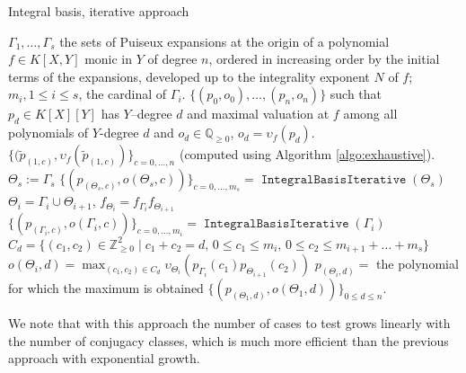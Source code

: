 \documentclass[a4paper,11pt]{amsart}%
\theoremstyle{definition}
\theoremstyle{plain}
\theoremstyle{remark}
\DeclareMathOperator{\IntegralBasisIterative}{\mathtt{IntegralBasisIterative}}
\newcommand{\Q}{{\mathbb Q}}
\newcommand{\Z}{{\mathbb Z}}
\newcommand{\vardbtilde}[1]{\tilde{\raisebox{0pt}[0.85\height]{$\tilde{#1}$}}}
\begin{document}


\begin{algorithm}[h]                      %
\caption{Integral basis, iterative approach}          %
\label{algo:iterative}
\begin{algorithmic}[1]
\REQUIRE $\Gamma_1, \dots, \Gamma_s$ the sets of Puiseux expansions at the origin of a polynomial $f \in K[X,Y]$ monic in $Y$ of degree $n$, ordered in increasing order by the initial terms of the expansions, developed up to the integrality exponent $N$ of $f$; $m_i, 1 \le i \le s$, the cardinal of $\Gamma_i$.
\ENSURE $\{(p_0, o_0), \dots, (p_{n}, o_{n})\}$ such that $p_d \in K[X][Y]$ has $Y$--degree $d$ and
maximal valuation at $f$ among all polynomials of $Y$-degree $d$ and $o_d \in \Q_{\geq 0}$, $o_d = \upsilon_f(p_d)$.
\RETURN $\{(\tilde p_{(1, c)}, \upsilon_{f}(\tilde p_{(1, c)})\}_{c= 0, \dots, n}$ (computed using Algorithm \ref{algo:exhaustive}).
\ELSE
\STATE $\Theta_s := \Gamma_s$
\STATE $\{(p_{(\Theta_s,c)}, o(\Theta_s, c))\}_{c = 0, \dots, m_s} = \IntegralBasisIterative(\Theta_s)$
\STATE $\Theta_i = \Gamma_i \cup \Theta_{i+1}$, $f_{\Theta_i} = f_{\Gamma_i} f_{\Theta_{i+1}}$
\STATE $\{(p_{(\Gamma_i,c)}, o(\Gamma_i, c))\}_{c = 0, \dots, m_i} = \IntegralBasisIterative(\Gamma_i)$
\STATE $C_d = \{(c_1, c_2) \in \Z_{\ge 0}^2 \mid c_1 + c_2 = d\mbox{, }0 \leq c_1 \leq m_i\mbox{, }0 \leq c_2 \leq m_{i+1} + \dots + m_s\}$
\STATE $o(\Theta_{i}, d) = \max_{(c_1, c_2) \in C_d} \upsilon_{{\Theta_{i}}%
}(p_{\Gamma_{i}}(c_{1})p_{\Theta_{i+1}}(c_{2}))$
\STATE $p_{(\Theta_i,d)} = $ the polynomial for which the maximum is obtained
\ENDFOR
\ENDFOR
\RETURN $\{(p_{(\Theta_1,d)}, o(\Theta_1, d))\}_{0 \le d \le n}$.
\ENDIF
\end{algorithmic}
\end{algorithm}

We note that with this approach the number of cases to test grows linearly with the number of conjugacy classes, which is much more efficient than the previous approach with exponential growth.
\end{document}
